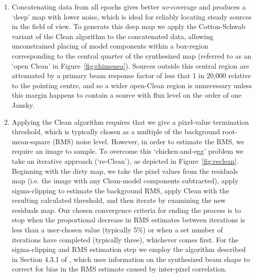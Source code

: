 \documentclass[5p,authoryear]{elsarticle}
\begin{document}
\begin{enumerate}[I]
 \item Concatenating data from all epochs gives better \textit{uv}-coverage and produces a `deep' map with lower noise, which is ideal for reliably locating steady sources in the field of view. To generate this deep map we apply the Cotton-Schwab variant of the Clean algorithm \citep{Schwab1984} to the concatenated data, allowing unconstrained placing of model components within a box-region corresponding to the central quarter of the synthesized map (referred to as an `open Clean' in Figure~\ref{fig:chimenea}). 
Sources outside this central region are attenuated by a primary beam response factor of less that 1 in 20,000 relative to the pointing centre, and so a wider open-Clean region is unnecessary unless this margin happens to contain a source with flux level on the order of one Jansky. 

 \item Applying the Clean algorithm requires that we give a pixel-value termination threshold, which is typically chosen as a multiple of the background root-mean-square (RMS) noise level. 
 However, in order to estimate the RMS, we require an image to sample. 
 To overcome this `chicken-and-egg' problem we take an iterative approach (`re-Clean'), as depicted in Figure~\ref{fig:reclean}. 
 Beginning with the dirty map, we take the pixel values from the residuals map (i.e. the image with any Clean-model components subtracted), apply sigma-clipping to estimate the background RMS,  apply Clean with the resulting calculated threshold, and then iterate by examining the new residuals map.
 Our chosen convergence criteria for ending the process is to stop when the proportional decrease in RMS estimates between iterations is less than a user-chosen value (typically 5\%) or when a set number of iterations have completed (typically three), whichever comes first. 
 For the sigma-clipping and RMS estimation step we employ the algorithm described in Section 4.3.1 of \cite{Swinbank2015}, which uses information on the synthesized beam shape to correct for bias in the RMS estimate caused by inter-pixel correlation.
 

\end{enumerate}
\end{document}
